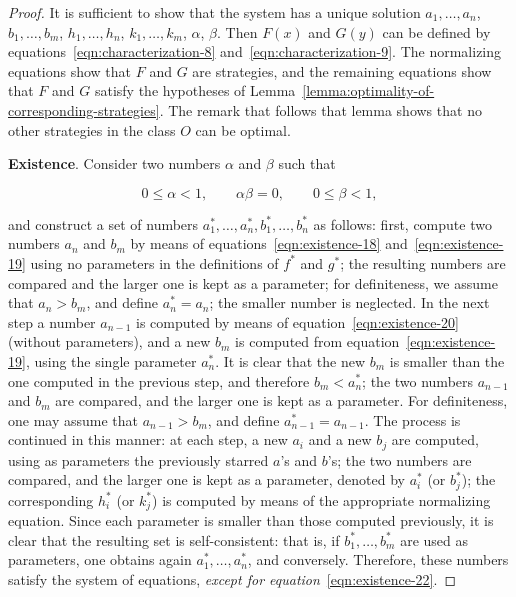 \documentclass{article}
\begin{document}
\begin{proof}

It is sufficient to show that the system has a unique solution $a_1, \dots,
a_n$, $b_1, \dots, b_m$, $h_1, \dots, h_n$, $k_1, \dots, k_m$, $\alpha$,
$\beta$. Then $F(x)$ and $G(y)$ can be defined by
equations~\ref{eqn:characterization-8} and~\ref{eqn:characterization-9}. The
normalizing equations show that $F$ and $G$ are strategies, and the remaining
equations show that $F$ and $G$ satisfy the hypotheses of
Lemma~\ref{lemma:optimality-of-corresponding-strategies}. The remark that
follows that lemma shows that no other strategies in the class $O$ can be
optimal.

\textbf{Existence}. Consider two numbers $\alpha$ and $\beta$ such that

\[
0 \leq \alpha < 1, \qquad \alpha \beta = 0, \qquad 0 \leq \beta < 1,
\]

and construct a set of numbers $a_1^*, \dots, a_n^*, b_1^*, \dots, b_n^*$ as
follows: first, compute two numbers $a_n$ and $b_m$ by means of
equations~\ref{eqn:existence-18} and~\ref{eqn:existence-19} using no parameters
in the definitions of $f^*$ and $g^*$; the resulting numbers are compared and
the larger one is kept as a parameter; for definiteness, we assume that $a_n >
b_m$, and define $a_n^* = a_n$; the smaller number is neglected. In the next
step a number $a_{n-1}$ is computed by means of equation~\ref{eqn:existence-20}
(without parameters), and a new $b_m$ is computed from
equation~\ref{eqn:existence-19}, using the single parameter $a_n^*$. It is
clear that the new $b_m$ is smaller than the one computed in the previous step,
and therefore $b_m < a_n^*$; the two numbers $a_{n-1}$ and $b_m$ are compared,
and the larger one is kept as a parameter. For definiteness, one may assume
that $a_{n-1} > b_m$, and define $a_{n-1}^* = a_{n-1}$. The process is
continued in this manner: at each step, a new $a_i$ and a new $b_j$ are
computed, using as parameters the previously starred $a$'s and $b$'s; the two
numbers are compared, and the larger one is kept as a parameter, denoted by
$a_i^*$ (or $b_j^*$); the corresponding $h_i^*$ (or $k_j^*$) is computed by
means of the appropriate normalizing equation. Since each parameter is smaller
than those computed previously, it is clear that the resulting set is
self-consistent: that is, if $b_1^*, \dots, b_m^*$ are used as parameters, one
obtains again $a_1^*, \dots, a_n^*$, and conversely. Therefore, these numbers
satisfy the system of equations, \emph{except for
equation}~\ref{eqn:existence-22}.


\end{proof}
\end{document}
